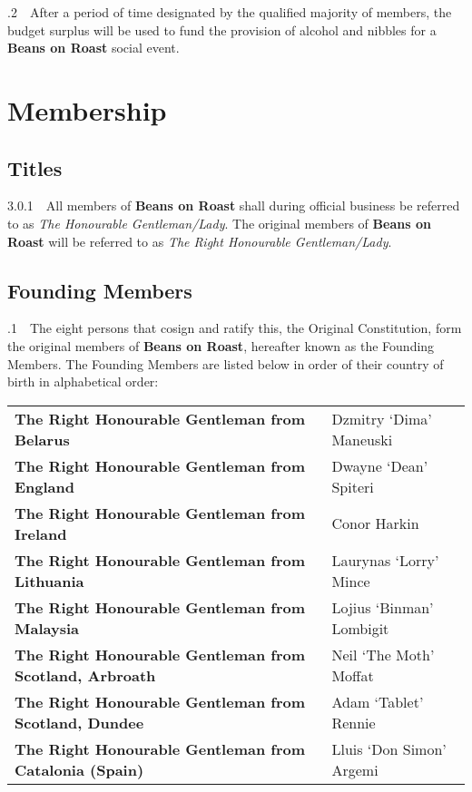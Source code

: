 \documentclass[a4paper,11pt]{article}
\begin{document}
.2$\quad$After a period of time designated by the qualified majority of members, the budget surplus will be used to fund the provision of alcohol and nibbles for a \textbf{Beans on Roast} social event.

\section{Membership}
\label{Membership}
\subsection{Titles}
\label{Titles}
3.0.1$\quad$All members of \textbf{Beans on Roast} shall during official business be referred to as \textit{The Honourable Gentleman/Lady}. The original members of \textbf{Beans on Roast} will be referred to as \textit{The Right Honourable Gentleman/Lady}.

\subsection{Founding Members}
\label{Founding Members}
.1$\quad$The eight persons that cosign and ratify this, the Original Constitution, form the original members of \textbf{Beans on Roast}, hereafter known as the Founding Members. The Founding Members are listed below in order of their country of birth in alphabetical order: 

\begin{table}[h!]
\begin{tabular}{ll}
\textbf{The Right Honourable Gentleman from  Belarus} & Dzmitry `Dima'  Maneuski \\
\textbf{The Right Honourable Gentleman from England} & Dwayne `Dean' Spiteri \\
\textbf{The Right Honourable Gentleman from Ireland} & Conor Harkin \\
\textbf{The Right Honourable Gentleman from Lithuania} & Laurynas `Lorry' Mince \\
\textbf{The Right Honourable Gentleman from Malaysia} & Lojius `Binman' Lombigit \\
\textbf{The Right Honourable Gentleman from Scotland, Arbroath} & Neil `The Moth' Moffat \\
\textbf{The Right Honourable Gentleman from Scotland, Dundee} & Adam `Tablet' Rennie \\
\textbf{The Right Honourable Gentleman from Catalonia (Spain)} & Lluis `Don Simon' Argemi
\end{tabular}
\end{table}
\end{document}
